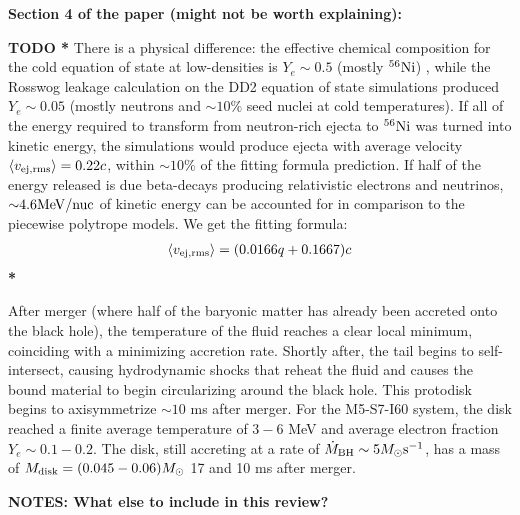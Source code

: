\textbf{Section 4 of the paper (might not be worth explaining): }

\textbf{TODO * }There is a physical difference: the effective chemical composition for the cold equation of state at low-densities is $Y_e \sim 0.5$ (mostly $^{56}{\rm Ni}$) , while the Rosswog leakage calculation on the DD2 equation of state simulations produced $Y_e \sim 0.05$ (mostly neutrons and $\sim 10\%$ seed nuclei at cold temperatures).
If all of the energy required to transform from neutron-rich ejecta to $^{56}{\rm Ni}$ was turned into kinetic energy, the simulations would produce ejecta with average velocity $\left\langle v_{\rm ej, rms} \right\rangle = 0.22 c$, within $\sim 10\%$ of the fitting formula prediction.
If half of the energy released is due beta-decays producing relativistic electrons and neutrinos, $\mathord{\sim} 4.6 {\rm MeV/nuc}$ of kinetic energy can be accounted for in comparison to the piecewise polytrope models.
We get the fitting formula:
\begin{align}
\label{e:vej_spec}
\left\langle v_{\rm ej, rms} \right\rangle = (0.0166 q + 0.1667) c
\end{align}
 \textbf{ * }


After merger (where half of the baryonic matter has already been accreted onto the black hole), the temperature of the fluid reaches a clear local minimum, coinciding with a minimizing accretion rate.  Shortly after, the tail begins to self-intersect, causing hydrodynamic shocks that reheat the fluid and causes the bound material to begin circularizing around the black hole.  
This protodisk begins to axisymmetrize $\sim 10$ ms after merger.  
For the M5-S7-I60 system, the disk reached a finite average temperature of $3 - 6$ MeV and average electron fraction $Y_e \sim 0.1 - 0.2$.  The disk, still accreting at a rate of $\dot{M}_{\rm BH} \sim 5 M_\odot {\rm s}^{-1}$, has a mass of $M_{\rm disk} = (0.045 - 0.06) M_\odot$ 17 and 10 ms after merger.


\textbf{NOTES: What else to include in this review?}  